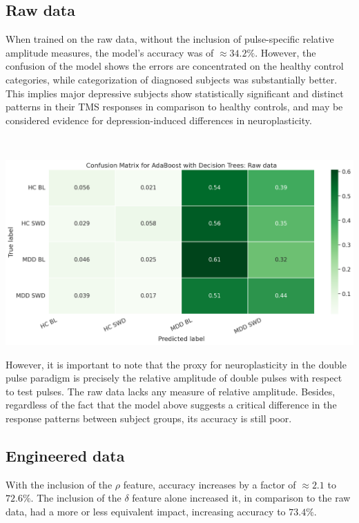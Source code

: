 \documentclass{article}
\begin{document}
\begin{multicols}{2}
\subsection{Raw data}

When trained on the raw data, without the inclusion of pulse-specific relative
amplitude measures, the model's accuracy was of $\approx34.2 \%$. However, the
confusion of the model shows the errors are concentrated on the healthy control
categories, while categorization of diagnosed subjects was substantially better.
This implies major depressive subjects show statistically significant and
distinct patterns in their TMS responses in comparison to healthy controls, and
may be considered evidence for depression-induced differences in
neuroplasticity.

\end{multicols}

\centering
~

\includegraphics[scale=0.4]{cm-raw}


\justifying
\begin{multicols}{2}

However, it is important to note that the proxy for neuroplasticity in the
double pulse paradigm is precisely the relative amplitude of double pulses with
respect to test pulses. The raw data lacks any measure of relative amplitude.
Besides, regardless of the fact that the model above suggests a critical
difference in the response patterns between subject groups, its accuracy is
still poor.

\subsection{Engineered data}

With the inclusion of the $\rho$ feature, accuracy increases by a factor of
$\approx 2.1$ to $72.6\%$. The inclusion of the $\delta$ feature alone increased
it, in comparison to the raw data, had a more or less equivalent impact,
increasing accuracy to $73.4\%$.


\end{multicols}
\raggedright
\end{document}
